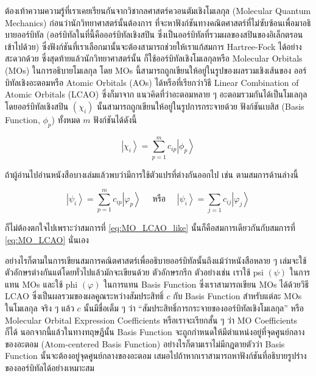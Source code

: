 ต้องเท้าความความรู้ที่เราเคยเรียนกันจากวิชากลศาสตร์ควอนตัมเชิงโมเลกุล (Molecular Quantum Mechanics) ก่อนว่านักวิทยาศาสตร์นั้นต้องการ%
ที่จะหาฟังก์ชันทางคณิตศาสตร์ที่ไม่ซับซ้อนเพื่อมาอธิบายออร์บิทัล (ออร์บิทัลในที่นี้คือออร์บิทัลเชิงสปิน ซึ่งเป็นออร์บิทัลที่รวมผลของสปินของอิเล็กตรอน%
เข้าไปด้วย) ซึ่งฟังก์ชันที่เราเลือกมานั้นจะต้องสามารถช่วยให้เราแก้สมการ Hartree-Fock ได้อย่างสะดวกด้วย ซึ่งสุดท้ายแล้วนักวิทยาศาสตร์นั้น%
ก็ใช้ออร์บิทัลเชิงโมเลกุลหรือ Molecular Orbitals (MOs) ในการอธิบายโมเลกุล โดย MOs นี้สามารถถูกเขียนให้อยู่ในรูปของผลรวมเชิงเส้นของ%
ออร์บิทัลเชิงอะตอมหรือ Atomic Orbitals (AOs) ได้หรือที่เรียกว่าวิธี Linear Combination of Atomic Orbitals (LCAO) ซึ่งก็มาจาก%
แนวคิดที่ว่าอะตอมหลาย ๆ อะตอมรวมกันได้เป็นโมเลกุล โดยออร์บิทัลเชิงสปิน $(\chi_{i})$ นั้นสามารถถูกเขียนให้อยู่ในรูปการกระจายด้วย%
ฟังก์ชันเบสิส (Basis Function, $\phi_p$) ทั้งหมด $m$ ฟังก์ชันได้ดังนี้

\begin{equation}
  \label{eq:MO_LCAO}
  \left|\chi_i\right\rangle
  =
  \sum_{p=1}^m c_{i p}\left|\phi_p\right\rangle
\end{equation}

\noindent ถ้าผู้อ่านไปอ่านหนังสือบางเล่มแล้วพบว่ามีการใช้ตัวแปรที่ต่างกันออกไป เช่น ตามสมการด้านล่างนี้

\begin{equation}
  \label{eq:MO_LCAO_like}
  \left|\psi_{i}\right\rangle
  =
  \sum_{p=1}^m c_{i p}\left|\varphi_{p}\right\rangle
  \quad \text{ หรือ } \quad
  \left|\psi_{i}\right\rangle
  =
  \sum_{j=1} c_{i j}\left|\varphi_{j}\right\rangle
\end{equation}

\noindent ก็ไม่ต้องตกใจไปเพราะว่าสมการที่ \eqref{eq:MO_LCAO_like} นั้นก็คือสมการเดียวกันกับสมการที่ \eqref{eq:MO_LCAO} นั่นเอง

อย่างไรก็ตามในการเขียนสมการคณิตศาสตร์เพื่ออธิบายออร์บิทัลนั้นถึงแม้ว่าหนังสือหลาย ๆ เล่มจะใช้ตัวอักษรต่างกันแต่โดยทั่วไปแล้วมักจะเขียนด้วย%
ตัวอักษรกรีก ตัวอย่างเช่น เราใช้ psi $(\psi)$ ในการแทน MOs และใช้ phi $(\varphi)$ ในการแทน Basis Function ซึ่งเราสามารถเขียน
MOs ได้ด้วยวิธี LCAO ซึ่งเป็นผลรวมของผลคูณระหว่างสัมประสิทธิ์ $c$ กับ Basis Function สำหรับแต่ละ MOs ในโมเลกุล จริง ๆ แล้ว $c$
นั้นมีชื่อเต็ม ๆ ว่า \enquote{สัมประสิทธิ์การกระจายของออร์บิทัลเชิงโมเลกุล} หรือ Molecular Orbital Expression Coefficients
หรือเราจะเรียกสั้น ๆ ว่า MO Coefficients ก็ได้ นอกจากนี้แล้วในทางทฤษฎีนั้น Basis Function จะถูกกำหนดให้มีตำแหน่งอยู่ที่จุดศูนย์กลาง%
ของอะตอม (Atom-centered Basis Function) อย่างไรก็ตามเราไม่มีกฎตายตัวว่า Basis Function นั้นจะต้องอยู่จุดศูนย์กลางของอะตอม%
เสมอไปถ้าหากเราสามารถหาฟังก์ชันที่อธิบายรูปร่างของออร์บิทัลได้อย่างเหมาะสม

